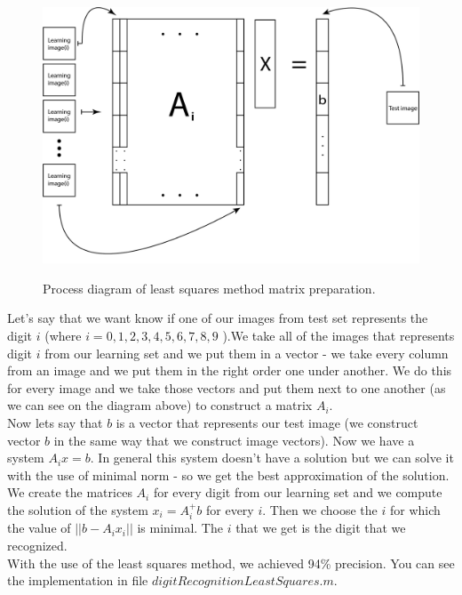\documentclass[12pt]{article}
\begin{document}
\begin{figure}[h]
	\centering
	\includegraphics[clip,scale=0.68]{images/matrike.png}\underline{}
	\caption[Process diagram of least squares method matrix preparation]{Process diagram of least squares method matrix preparation.}
	
\end{figure}

\newpage
Let's say that we want know if one of our images from test set represents the digit $i$ (where $i = {0, 1, 2, 3, 4, 5, 6, 7, 8, 9}$ ).We take all of the images that represents digit $i$ from our learning set and we put them in a vector - we take every column from an image and we put them in the right order one under another. We do this for every image and we take those vectors and put them next to one another (as we can see on the diagram above) to construct a matrix \textbf{$A_{i}$}.\\
\newline
Now lets say that $b$ is a vector that represents our test image (we construct vector $b$ in the same way that we construct image vectors). Now we have a system $A_{i}x = b$. In general this system doesn't have a solution but we can solve it with the use of minimal norm - so we get the best approximation of the solution. We create the matrices $A_{i}$ for every digit from our learning set and we compute the solution of the system $x_{i} = A^{+}_{i}b$ for every $i$. Then we choose the $i$ for which the value of $|| b - A_{i}x_{i} ||$ is minimal. The $i$ that we get is the digit that we recognized.\\
\newline
With the use of the least squares method, we achieved 94\% precision. You can see the implementation in file $digitRecognitionLeastSquares.m$.
\end{document}
